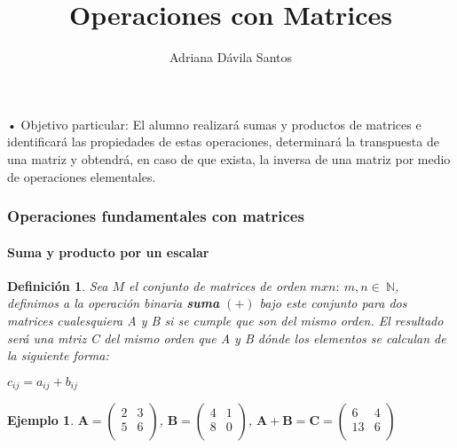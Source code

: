 \documentclass[11pt]{beamer}
\author{Adriana Dávila Santos}
\title{Operaciones con Matrices}
\newtheorem{defi}{Definición}
\newtheorem{ejem}{Ejemplo}
\begin{document}
\begin{frame}
\titlepage
\end{frame}


\begin{frame}{• Objetivo particular:}
El alumno realizará sumas y productos de matrices e identificará las propiedades de estas
operaciones, determinará la transpuesta de una matriz y obtendrá, en caso de que exista, la
inversa de una matriz por medio de operaciones elementales.
\end{frame}

\begin{frame}
\frametitle{Operaciones fundamentales con matrices}
\framesubtitle{Suma y producto por un escalar}
\begin{defi}
Sea $M$ el conjunto de matrices de orden $mxn:~m,n\in ~ \mathbb{N}$, definimos a la operación binaria \textbf{suma} $(+)$ bajo este conjunto para dos matrices cualesquiera A y B si se cumple que son del mismo orden. El resultado será una mtriz C del mismo orden que A y B dónde los elementos se calculan de la siguiente forma: \\
\begin{center}
$c_{ij} = a_{ij} + b_{ij}$
\end{center}
\end{defi}
\begin{ejem}
${\displaystyle \mathbf {A} ={\begin{pmatrix}2&3\\5&6\\\end{pmatrix}}}$, 
${\displaystyle \mathbf {B} ={\begin{pmatrix}4&1\\8&0\\\end{pmatrix}}}$, 
${\displaystyle \mathbf {A+B=C} ={\begin{pmatrix}6&4\\13&6\\\end{pmatrix}}}$
\end{ejem}
\end{frame}
\end{document}
